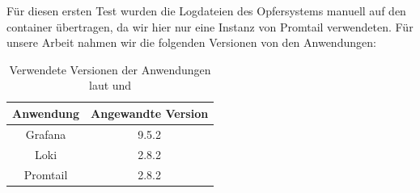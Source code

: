 





Für diesen ersten Test wurden die Logdateien des Opfersystems manuell auf den \gls{container} übertragen, da wir hier nur eine Instanz von Promtail verwendeten.  Für unsere Arbeit nahmen wir die folgenden Versionen von den Anwendungen:

\begin{table}[h]
   \centering
   \begin{tabular}{|c|c|}
   \hline
   \textbf{Anwendung}  & \textbf{Angewandte Version}  \\ \hline
   Grafana             & \cellcolor{green!25}9.5.2    \\ \hline
   Loki                & \cellcolor{green!25}2.8.2    \\ \hline
   Promtail            & \cellcolor{green!25}2.8.2    \\ \hline
   \end{tabular}
   \caption[Verwendete Versionen der Anwendungen]
   {Verwendete Versionen der Anwendungen laut \cite{Grafana_Version} und \cite{GrafanaLoki_Version}}
   \label{tab:Versions}
\end{table}

